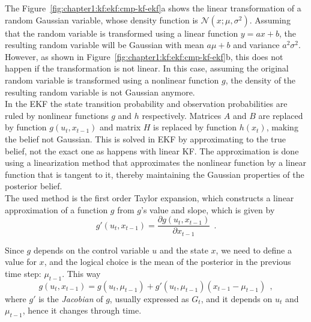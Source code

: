 The Figure~\ref{fig:chapter1:kf:ekf:cmp-kf-ekf}a shows the linear transformation of a random Gaussian variable, whose density function is $\mathcal{N}\left(x; \mu, \sigma^2 \right)$. Assuming that the random variable is transformed using a linear function $y = ax + b$, the resulting random variable will be Gaussian with mean $a\mu + b$ and variance $a^2 \sigma^2$. However, as shown in Figure~\ref{fig:chapter1:kf:ekf:cmp-kf-ekf}b, this does not happen if the transformation is not linear. In this case, assuming the original random variable is transformed using a nonlinear function $g$, the density of the resulting random variable is not Gaussian anymore.\\

In the \ac{EKF} the state transition probability and observation probabilities are ruled by nonlinear functions $g$ and $h$ respectively. Matrices $A$ and $B$ are replaced by function $g\left(u_t, x_{t-1}\right)$ and matrix $H$ is replaced by function $h \left(x_t\right)$, making the belief not Gaussian. This is solved in \ac{EKF} by approximating to the true belief, not the exact one as happens with linear \ac{KF}. The approximation is done using a linearization method that approximates the nonlinear function by a linear function that is tangent to it, thereby maintaining the Gaussian properties of the posterior belief. \\

The used method is the first order Taylor expansion, which constructs a linear approximation of a function $g$ from $g$'s value and slope, which is given by
\begin{equation}
    g' \left(u_t, x_{t-1}\right) = \frac{\partial g\left(u_t, x_{t-1}\right)}{\partial x_{t-1}}~~.
    \label{eq:chapter1:kf:ekf:g-derivative}
\end{equation}

 Since $g$ depends on the control variable $u$ and the state $x$, we need to define a value for $x$, and the logical choice is the mean of the posterior in the previous time step: $\mu_{t-1}$. This way
 \begin{equation}
    g \left(u_t, x_{t-1}\right) = g \left(u_t, \mu_{t-1}\right) + g' \left(u_t, \mu_{t-1}\right)\left(x_{t-1} - \mu_{t-1}\right)~~,
    \label{eq:chapter1:kf:ekf:g-mean-cov}
 \end{equation}
where $g'$ is the \emph{Jacobian} of $g$, usually expressed as $G_t$, and it depends on $u_t$ and $\mu_{t-1}$, hence it changes through time.\\

